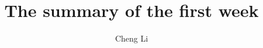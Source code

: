 \documentclass{amsart}
\begin{document}
%
%
\title[The Summary Of The First Week]{The summary of the first week}%

\author{Cheng Li}
\address[A.~1]{School of Geosciences,\\ 
China University Of Petroleum,East China}%


%
\date{\gitAuthorDate}%



\maketitle
\tableofcontents

\newpage



\newpage



\listoftodos
\end{document}
